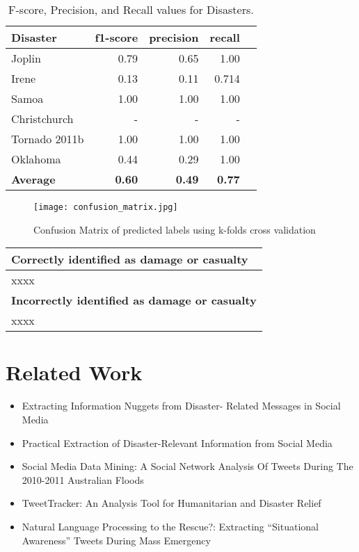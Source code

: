 \documentclass{article}
\begin{document}
\begin{table*}
\centering
\small
\begin{tabular}{|l|r|r|r| p{8cm} |}
\hline
{\bf Disaster}  & {\bf f1-score} & {\bf precision} & {\bf recall} \\
\hline
Joplin &  0.79  & 0.65       &  1.00 \\
Irene          &  0.13  &    0.11    &  0.714\\
Samoa        &  1.00  & 1.00   &  1.00\\
Christchurch        &  -  & - & - \\
Tornado 2011b     & 1.00 & 1.00   &  1.00\\
Oklahoma       & 0.44 & 0.29 & 1.00 \\
\hline
{\bf Average}  & {\bf 0.60} & {\bf 0.49}  & {\bf 0.77}  \\
\hline
\end{tabular}
\caption{F-score, Precision, and Recall values for Disasters.}
\label{tab.unseen_disaster}
\end{table*}

\begin{figure}[ht!]
\centering
\texttt{[image: confusion\_matrix.jpg]}
\caption{Confusion Matrix of predicted labels using k-folds cross validation}
\label{cm}
\end{figure}


\begin{table}[t]
\centering
\begin{tabular}{|l|}
\hline
{\bf Correctly identified as damage or casualty}\\
\hline
xxxx\\
\hline
{\bf Incorrectly identified as damage or casualty}\\
\hline
xxxx\\
\hline
\end{tabular}
\end{table}

\section{Related Work}
\begin{itemize}
\item Extracting Information Nuggets from Disaster- Related Messages in Social Media
\item Practical Extraction of Disaster-Relevant Information from Social Media
\item Social Media Data Mining: A Social Network Analysis Of Tweets During The 2010-2011 Australian Floods
\item TweetTracker: An Analysis Tool for Humanitarian and Disaster Relief
\item Natural Language Processing to the Rescue?: Extracting “Situational Awareness” Tweets During Mass Emergency
\end{itemize}
\end{document}

